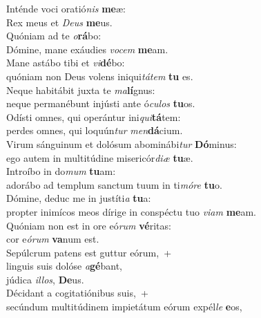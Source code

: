 \evenverse Inténde voci oratió\textit{nis} \textbf{me}æ:~\*\\
\evenverse Rex meus et \textit{De}\textit{us} \textbf{me}us.\\
\oddverse Quóniam ad te \textit{o}\textbf{rá}bo:~\*\\
\oddverse Dómine, mane exáudies \textit{vo}\textit{cem} \textbf{me}am.\\
\evenverse Mane astábo tibi et \textit{vi}\textbf{dé}bo:~\*\\
\evenverse quóniam non Deus volens iniqui\textit{tá}\textit{tem} \textbf{tu} es.\\
\oddverse Neque habitábit juxta te \textit{ma}\textbf{lí}gnus:~\*\\
\oddverse neque permanébunt injústi ante ó\textit{cu}\textit{los} \textbf{tu}os.\\
\evenverse Odísti omnes, qui operántur ini\textit{qui}\textbf{tá}tem:~\*\\
\evenverse perdes omnes, qui loquún\textit{tur} \textit{men}\textbf{dá}cium.\\
\oddverse Virum sánguinum et dolósum abominábi\textit{tur} \textbf{Dó}minus:~\*\\
\oddverse ego autem in multitúdine misericór\textit{di}\textit{æ} \textbf{tu}æ.\\
\evenverse Introíbo in do\textit{mum} \textbf{tu}am:~\*\\
\evenverse adorábo ad templum sanctum tuum in ti\textit{mó}\textit{re} \textbf{tu}o.\\
\oddverse Dómine, deduc me in justíti\textit{a} \textbf{tu}a:~\*\\
\oddverse propter inimícos meos dírige in conspéctu tuo \textit{vi}\textit{am} \textbf{me}am.\\
\evenverse Quóniam non est in ore eó\textit{rum} \textbf{vé}ritas:~\*\\
\evenverse cor e\textit{ó}\textit{rum} \textbf{va}num est.\\
\oddverse Sepúlcrum patens est guttur eórum,~+\\
\oddverse  linguis suis dolóse \textit{a}\textbf{gé}bant,~\*\\
\oddverse júdica \textit{il}\textit{los}, \textbf{De}us.\\
\evenverse Décidant a cogitatiónibus suis,~+\\
\evenverse  secúndum multitúdinem impietátum eórum expél\textit{le} \textbf{e}os,~\*\\
